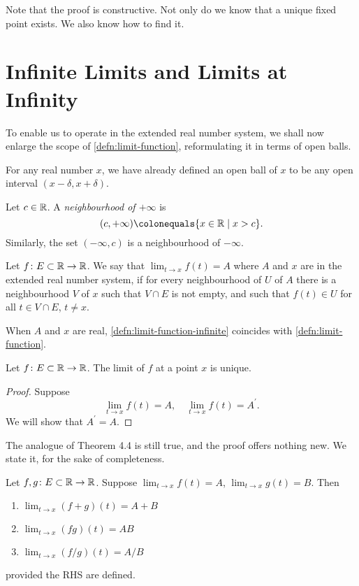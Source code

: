 Note that the proof is constructive. Not only do we know that a unique fixed point exists. We also know how to find it.
\pagebreak

\section{Infinite Limits and Limits at Infinity}
To enable us to operate in the extended real number system, we shall now enlarge the scope of \cref{defn:limit-function}, reformulating it in terms of open balls.

For any real number $x$, we have already defined an open ball of $x$ to be any open interval $(x-\delta,x+\delta)$.

\begin{definition}
Let $c\in\mathbb R$. A \emph{neighbourhood of $+\infty$} is
\[(c,+\infty)\colonequals\{x\in\RR\mid x>c\}.\]
Similarly, the set $(-\infty,c)$ is a neighbourhood of $-\infty$.
\end{definition}

\begin{definition}\label{defn:limit-function-infinite}
Let $f\colon E\subset\mathbb R\to\mathbb R$. We say that $\displaystyle\lim_{t\to x}f(t)=A$ where $A$ and $x$ are in the extended real number system, if for every neighbourhood of $U$ of $A$ there is a neighbourhood $V$ of $x$ such that $V\cap E$ is not empty, and such that $f(t)\in U$ for all $t\in V\cap E$, $t\neq x$.
\end{definition}

\begin{remark}
When $A$ and $x$ are real, \cref{defn:limit-function-infinite} coincides with \cref{defn:limit-function}.
\end{remark}


\begin{lemma}
Let $f\colon E\subset\mathbb R\to\mathbb R$. The limit of $f$ at a point $x$ is unique.
\end{lemma}

\begin{proof}
Suppose
\[\lim_{t\to x}f(t)=A,\quad\lim_{t\to x}f(t)=A^\prime.\]
We will show that $A^\prime=A$.
\end{proof}

The analogue of Theorem 4.4 is still true, and the proof offers nothing new. We state it, for the sake of completeness. 

\begin{lemma}
Let $f,g\colon E\subset\mathbb R\to\mathbb R$. Suppose $\displaystyle\lim_{t\to x}f(t)=A$, $\displaystyle\lim_{t\to x}g(t)=B$. Then
\begin{enumerate}[label=(\roman*)]
\item $\displaystyle\lim_{t\to x}(f+g)(t)=A+B$
\item $\displaystyle\lim_{t\to x}(fg)(t)=AB$
\item $\displaystyle\lim_{t\to x}(f/g)(t)=A/B$
\end{enumerate}
provided the RHS are defined.
\end{lemma}

